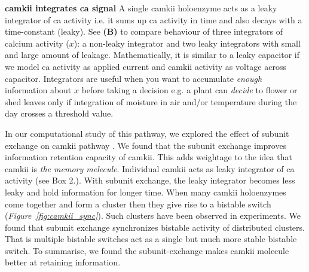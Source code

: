\documentclass[]{resonance}
\newcommand\Fig[1]{\textit{Figure~\ref{#1}}}
\begin{document}
{    \textbf{\gls{camkii} integrates \gls{ca} signal} A single \gls{camkii}
    holoenzyme acts as a leaky integrator of \gls{ca} activity i.e. it sums up
    \gls{ca} activity in time and also decays with a time-constant (leaky). See
    \textbf{(B)} to compare behaviour of three integrators of calcium activity
    ($x$): a non-leaky integrator and two leaky integrators with small and large
    amount of leakage.  Mathematically, it is similar to a leaky capacitor if we
    model \gls{ca} activity as applied current and \gls{camkii} activity as
    voltage across capacitor.  Integrators are useful when you want to
    accumulate \emph{enough} information about $x$ before taking a decision e.g.
    a plant can \emph{decide} to flower or shed leaves only if integration of
    moisture in air and/or temperature during the day crosses a threshold value.

} %

In our computational study of this pathway, we explored the effect of subunit
exchange on \gls{camkii} pathway \cite{SinghAndBhalla2018}.  We found that the
subunit exchange improves information retention capacity of \gls{camkii}. This
adds weightage to the idea that \gls{camkii} is \textit{the memory melecule}.
Individual \gls{camkii} acts as leaky integrator of \gls{ca} activity (see Box
2.). With subunit exchange, the leaky integrator becomes less leaky and hold
information for longer time. When many \gls{camkii} holoenzymes come together
and form a cluster then they give rise to a bistable switch
(\Fig{fig:camkii_sync}). Such clusters have been observed in experiments. We
found that subunit exchange synchronizes bistable activity of distributed
clusters.  That is multiple bistable switches act as a single but much more
stable bistable switch. To summarise, we found the subunit-exchange makes
\gls{camkii} molecule better at retaining information.
\end{document}
